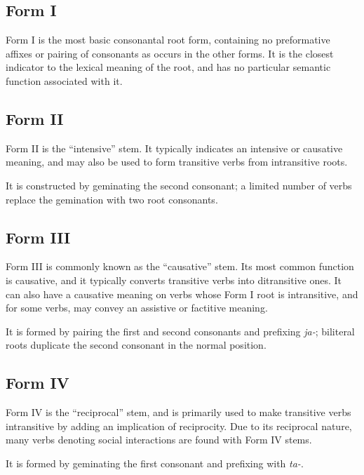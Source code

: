 \documentclass[grammar]{subfiles}
\begin{document}
  \subsection{Form I}
  \label{ssec:dev_verb_form_i}

  Form I is the most basic consonantal root form, containing no preformative affixes or pairing of consonants as occurs in the other forms. It is the closest indicator to the lexical meaning of the root, and has no particular semantic function associated with it.

  \subsection{Form II}
  \label{ssec:dev_verb_form_ii}

  Form II is the “intensive” stem. It typically indicates an intensive or causative meaning, and may also be used to form transitive verbs from intransitive roots.

  It is constructed by geminating the second consonant; a limited number of verbs replace the gemination with two root consonants.

  \subsection{Form III}
  \label{ssec:dev_verb_form_iii}

  Form III is commonly known as the “causative” stem. Its most common function is causative, and it typically converts transitive verbs into ditransitive ones. It can also have a causative meaning on verbs whose Form I root is intransitive, and for some verbs, may convey an assistive or factitive meaning.

  It is formed by pairing the first and second consonants and prefixing \textit{ja-}; biliteral roots duplicate the second consonant in the normal position.

  \subsection{Form IV}
  \label{ssec:dev_verb_form_iv}

  Form IV is the “reciprocal” stem, and is primarily used to make transitive verbs intransitive by adding an implication of reciprocity. Due to its reciprocal nature, many verbs denoting social interactions are found with Form IV stems. 

  It is formed by geminating the first consonant and prefixing with \textit{ta-}.
\end{document}
